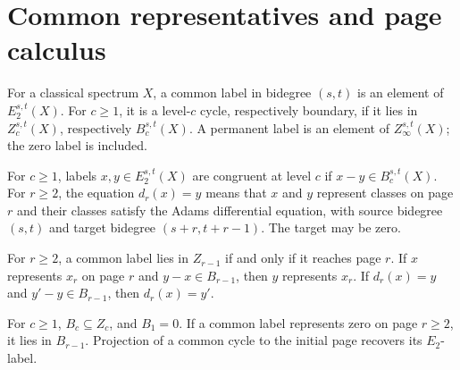 

\section{Common representatives and page calculus}


\begin{definition}
\label{sem:ProofTools:common-labels}
For a classical spectrum $X$, a common label in bidegree $(s,t)$ is an element of $E_2^{s,t}(X)$. For $c\geq1$, it is a level-$c$ cycle, respectively boundary, if it lies in $Z_c^{s,t}(X)$, respectively $B_c^{s,t}(X)$. A permanent label is an element of $Z_\infty^{s,t}(X)$; the zero label is included.
\end{definition}

\begin{definition}
\label{sem:ProofTools:congruence-and-differential}
For $c\geq1$, labels $x,y\in E_2^{s,t}(X)$ are congruent at level $c$ if $x-y\in B_c^{s,t}(X)$. For $r\geq2$, the equation $d_r(x)=y$ means that $x$ and $y$ represent classes on page $r$ and their classes satisfy the Adams differential equation, with source bidegree $(s,t)$ and target bidegree $(s+r,t+r-1)$. The target may be zero.
\end{definition}

\begin{theorem}
\label{sem:ProofTools:cycle-reaches}
For $r\geq2$, a common label lies in $Z_{r-1}$ if and only if it reaches page $r$. If $x$ represents $x_r$ on page $r$ and $y-x\in B_{r-1}$, then $y$ represents $x_r$. If $d_r(x)=y$ and $y'-y\in B_{r-1}$, then $d_r(x)=y'$.
\end{theorem}

\begin{theorem}
\label{sem:ProofTools:boundary-calculus}
For $c\geq1$, $B_c\subseteq Z_c$, and $B_1=0$. If a common label represents zero on page $r\geq2$, it lies in $B_{r-1}$. Projection of a common cycle to the initial page recovers its $E_2$-label.
\end{theorem}

